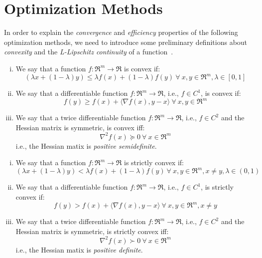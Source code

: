 \section{Optimization Methods}

In order to explain the \emph{convergence} and \emph{efficiency} properties of the following optimization methods, we need to introduce some preliminary definitions about \emph{convexity} and the \emph{L-Lipschitz continuity} of a function~\cite{boyd2004convex}.

\begin{definition}[Convexity] \label{def:convexity}
	\hfill
	\begin{enumerate}[(i)]
		\item We say that a function $f: \Re^m \rightarrow \Re$ is convex if: 
		$$ 
			(\lambda x + (1 - \lambda) y ) \leq \lambda f(x) + (1 - \lambda) f(y) \ \forall \ x, y \in \Re^m, \lambda \in [0,1] 
		$$
		\item We say that a differentiable function $f: \Re^m \rightarrow \Re$, i.e., $f \in C^1$, is convex if: 
		$$ 
			f(y) \geq f(x) + \langle \nabla f(x), y - x \rangle \ \forall \ x, y \in \Re^m 
		$$
		\item We say that a twice differentiable function $f: \Re^m \rightarrow \Re$, i.e., $f \in C^2$ and the Hessian matrix is symmetric, is convex iff: 
		$$ 
			\nabla^2 f(x) \succeq 0 \ \forall \ x \in \Re^m 
		$$ i.e., the Hessian matix is \emph{positive semidefinite}.
	\end{enumerate}
\end{definition}

\begin{definition} \label{def:strict_convexity}
	\hfill
	\begin{enumerate}[(i)]
		\item We say that a function $f: \Re^m \rightarrow \Re$ is strictly convex if: 
		$$ 
			(\lambda x + (1 - \lambda) y ) < \lambda f(x) + (1 - \lambda) f(y) \ \forall \ x, y \in \Re^m, x \neq y, \lambda \in (0,1) 
		$$
		\item We say that a differentiable function $f: \Re^m \rightarrow \Re$, i.e., $f \in C^1$, is strictly convex if: 
		$$ 
			f(y) > f(x) + \langle \nabla f(x), y - x \rangle \ \forall \ x, y \in \Re^m, x \neq y
		$$
		\item We say that a twice differentiable function $f: \Re^m \rightarrow \Re$, i.e., $f \in C^2$ and the Hessian matrix is symmetric, is strictly convex iff: 
		$$ 
			\nabla^2 f(x) \succ 0 \ \forall \ x \in \Re^m 
		$$ i.e., the Hessian matix is \emph{positive definite}.
	\end{enumerate}
\end{definition}

